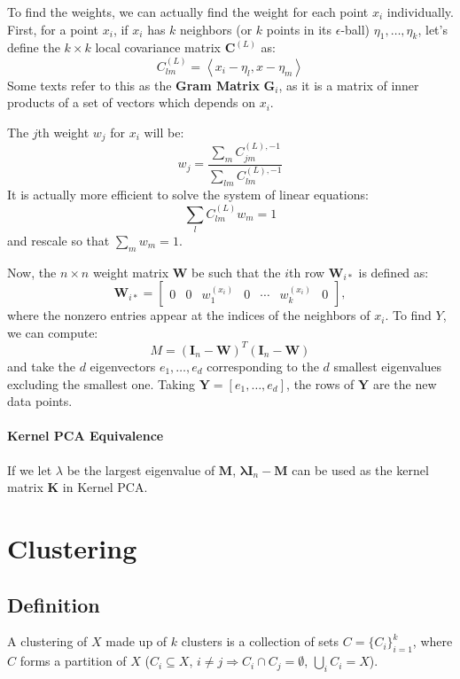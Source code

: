 \documentclass[12pt,a4paper]{article}
\newcommand{\abr}[1]{\left\langle #1 \right\rangle}
\newcommand{\bmat}[1]{\begin{bmatrix} #1\end{bmatrix}}
\newcommand{\1}[1]{\mathds{1}\left[#1\right]}
\newcommand{\B}[1]{\mathbf{#1}}
\begin{document}
To find the weights, we can actually find the weight for each point $x_i$ individually. First, for a point $x_i$, if $x_i$ has $k$ neighbors (or $k$ points in its $\epsilon$-ball) $\eta_1,\ldots,\eta_k$, let's define the $k\times k$ local covariance matrix $\B C^{(L)}$ as:
\[C^{(L)}_{lm}=\abr{x_i-\eta_l,x-\eta_m}\]
Some texts refer to this as the \textbf{Gram Matrix} $\B G_i$, as it is a matrix of inner products of a set of vectors which depends on $x_i$.

The $j$th weight $w_j$ for $x_i$ will be:
\[w_j=\frac{\sum_m C^{(L),-1}_{jm}}{\sum_{lm} C^{(L),-1}_{lm}}\]
It is actually more efficient to solve the system of linear equations:
\[\sum_l C^{(L)}_{lm}w_m=1\]
and rescale so that $\sum_m w_m=1$.

Now, the $n\times n$ weight matrix $\B W$ be such that the $i$th row $\B W_{i*}$ is defined as:
\[\B W_{i*}=\bmat{0 & 0 & w_1^{(x_i)} & 0 &\cdots & w_k^{(x_i)}& 0},\]
where the nonzero entries appear at the indices of the neighbors of $x_i$. To find $Y$, we can compute:
\[M=(\B I_n-\B W)^T(\B I_n-\B W)\]
and take the $d$ eigenvectors $e_1,\ldots, e_d$ corresponding to the $d$ smallest eigenvalues excluding the smallest one. Taking $\B Y=[e_1,\ldots,e_d]$, the rows of $\B Y$ are the new data points.
\paragraph{Kernel PCA Equivalence} If we let $\lambda$ be the largest eigenvalue of $\B M$, $\B \lambda \B I_n-\B M$ can be used as the kernel matrix $\B K$ in Kernel PCA. \cite{fml}

\section{Clustering}

\subsection{Definition}
A clustering of $X$ made up of $k$ clusters is a collection of sets $C=\{C_i\}_{i=1}^k$, where $C$ forms a partition of $X$ ($C_i\subseteq X$, $i\neq j\Rightarrow  C_i\cap C_j=\emptyset$, $\bigcup_i C_i=X$).
\end{document}
